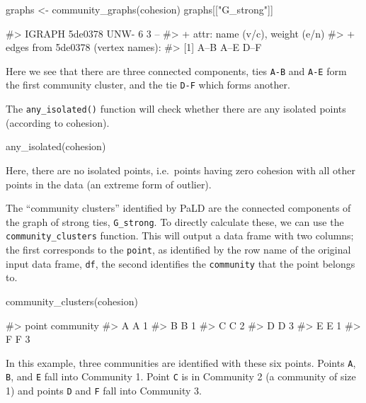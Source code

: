 \begin{Schunk}
\begin{Sinput}
graphs <- community_graphs(cohesion)
graphs[["G_strong"]]
\end{Sinput}
\begin{Soutput}
#> IGRAPH 5de0378 UNW- 6 3 --
#> + attr: name (v/c), weight (e/n)
#> + edges from 5de0378 (vertex names):
#> [1] A--B A--E D--F
\end{Soutput}
\end{Schunk}

Here we see that there are three connected components, ties \texttt{A-B}
and \texttt{A-E} form the first community cluster, and the tie
\texttt{D-F} which forms another.

The \texttt{any\_isolated()} function will check whether there are any
isolated points (according to cohesion).

\begin{Schunk}
\begin{Sinput}
any_isolated(cohesion)
\end{Sinput}
\end{Schunk}

\noindent Here, there are no isolated points, i.e.~points having zero
cohesion with all other points in the data (an extreme form of outlier).

The ``community clusters'' identified by PaLD are the connected
components of the graph of strong ties, \texttt{G\_strong}. To directly
calculate these, we can use the \texttt{community\_clusters} function.
This will output a data frame with two columns; the first corresponds to
the \texttt{point}, as identified by the row name of the original input
data frame, \texttt{df}, the second identifies the \texttt{community}
that the point belongs to.

\begin{Schunk}
\begin{Sinput}
community_clusters(cohesion)
\end{Sinput}
\begin{Soutput}
#>   point community
#> A     A         1
#> B     B         1
#> C     C         2
#> D     D         3
#> E     E         1
#> F     F         3
\end{Soutput}
\end{Schunk}

In this example, three communities are identified with these six points.
Points \texttt{A}, \texttt{B}, and \texttt{E} fall into Community 1.
Point \texttt{C} is in Community 2 (a community of size 1) and points
\texttt{D} and \texttt{F} fall into Community 3.

